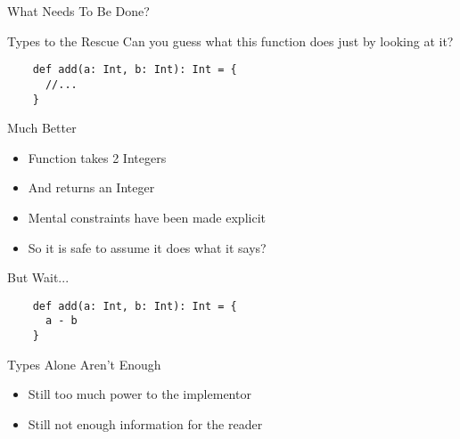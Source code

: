 \begin{section}{What Needs To Be Done?}
\begin{frame}[fragile]{Types to the Rescue}
  Can you guess what this function does just by looking at it?
  \begin{verbatim}
    def add(a: Int, b: Int): Int = {
      //...
    }
  \end{verbatim}
\end{frame}

\begin{frame}[fragile]{Much Better}
  \begin{itemize}
  \item Function takes 2 Integers
  \item And returns an Integer
  \item Mental constraints have been made explicit
  \item So it is safe to assume it does what it says?
  \end{itemize}
\end{frame}

\begin{frame}[fragile]{But Wait...}
  \begin{verbatim}
    def add(a: Int, b: Int): Int = {
      a - b
    }
  \end{verbatim}
\end{frame}

\begin{frame}[fragile]{Types Alone Aren't Enough}
  \begin{itemize}
  \item Still too much power to the implementor
  \item Still not enough information for the reader
  \end{itemize}
\end{frame}

\end{section}
